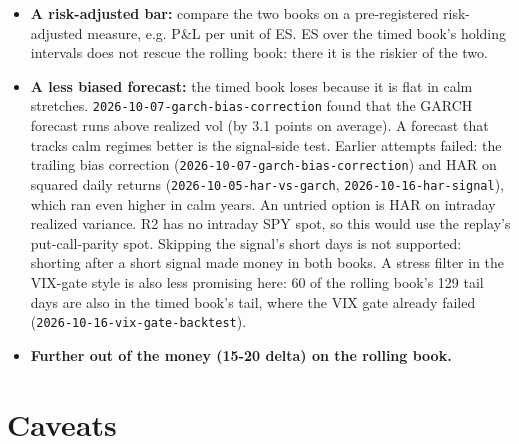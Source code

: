\documentclass{article}
\begin{document}
\begin{itemize}

\item \textbf{A risk-adjusted bar:} compare the two books on a pre-registered risk-adjusted measure, e.g. P\&L per unit of ES. ES over the timed book's holding intervals does not rescue the rolling book: there it is the riskier of the two.

\item \textbf{A less biased forecast:} the timed book loses because it is flat in calm stretches. \texttt{2026-\allowbreak{}10-\allowbreak{}07-\allowbreak{}garch-\allowbreak{}bias-\allowbreak{}correction} found that the GARCH forecast runs above realized vol (by 3.1 points on average). A forecast that tracks calm regimes better is the signal-side test. Earlier attempts failed: the trailing bias correction (\texttt{2026-\allowbreak{}10-\allowbreak{}07-\allowbreak{}garch-\allowbreak{}bias-\allowbreak{}correction}) and HAR on squared daily returns (\texttt{2026-\allowbreak{}10-\allowbreak{}05-\allowbreak{}har-\allowbreak{}vs-\allowbreak{}garch}, \texttt{2026-\allowbreak{}10-\allowbreak{}16-\allowbreak{}har-\allowbreak{}signal}), which ran even higher in calm years. An untried option is HAR on intraday realized variance. R2 has no intraday SPY spot, so this would use the replay's put-call-parity spot. Skipping the signal's short days is not supported: shorting after a short signal made money in both books. A stress filter in the VIX-gate style is also less promising here: 60 of the rolling book's 129 tail days are also in the timed book's tail, where the VIX gate already failed (\texttt{2026-\allowbreak{}10-\allowbreak{}16-\allowbreak{}vix-\allowbreak{}gate-\allowbreak{}backtest}).

\item \textbf{Further out of the money (15-20 delta) on the rolling book.}

\end{itemize}

\section{Caveats}
\end{document}
